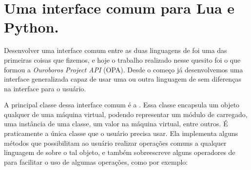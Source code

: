   
  \section{Uma interface comum para Lua e Python.}
  \label{sec:atividades:opa}
  Desenvolver uma interface comum entre as duas linguagens de \script{} foi uma das 
  primeiras coisas que fizemos, e hoje o trabalho realizado nesse quesito foi o que
  formou a \emph{Ouroboros Project API} (OPA). Desde o começo já desenvolvemos uma
  interface generalizada capaz de usar uma ou outra linguagem de \script{} sem
  diferenças na interface para o usuário.
  
  A principal classe dessa interface comum é a \VObj{}. Essa classe 
  encapsula um objeto qualquer de uma máquina virtual, podendo representar um
  módulo de \script{} carregado, uma instância de uma classe, um valor na máquina
  virtual, entre outros. É praticamente a única classe que o usuário precisa 
  usar. Ela implementa alguns métodos que possibilitam ao usuário realizar 
  operações comuns a qualquer linguagem de \script{} sobre o tal objeto, e 
  também sobreescreve alguns operadores de \CXX{} para facilitar o uso de 
  algumas operações, como por exemplo:
